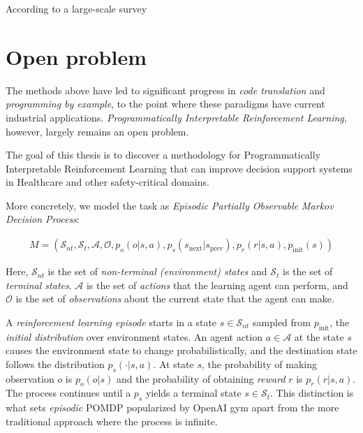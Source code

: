 According to a large-scale survey \cite{liangLargeScaleSurveyUsability2024} 

\newpage
\section{Open problem}

The methods above have led to significant progress in \emph{code translation} and \emph{programming by example}, to the point where these paradigms have current industrial applications.
\emph{Programmatically Interpretable Reinforcement Learning}, however, largely remains an open problem.

\begin{highlight}
The goal of this thesis is to discover a methodology for Programmatically Interpretable Reinforcement Learning that can improve decision support systems in Healthcare and other safety-critical domains.
\end{highlight}


More concretely, we model the task as {\em Episodic Partially Observable Markov Decision Process}:

\begin{multline}
M = (\mathcal{S}_{nt}, \mathcal{S}_t, \mathcal{A}, \mathcal{O}, p_o(o | s, a), p_s(s_\text{next} | s_\text{prev}), p_r(r | s, a), p_\text{init}(s))
\end{multline}

Here, $\mathcal{S}_{nt}$ is the set of {\em non-terminal (environment) states} and $\mathcal{S}_{t}$ is the set of {\em terminal states}. 
$\mathcal{A}$ is the set of {\em actions} that the learning agent can perform, and $\mathcal{O}$ is the set of {\em observations} about the current state that the agent can make. 

A \emph{reinforcement learning episode} starts in a state $s \in \mathcal{S}_{nt}$ sampled from $p_\text{init}$, the {\em initial distribution} over environment states.
An agent action $a \in \mathcal{A}$ at the state $s$ causes the environment state to change probabilistically, and the destination state follows the distribution $p_s(\cdot | s, a)$. 
At state $s$, the probability of making observation $o$ is $p_o(o | s)$ and the probability of obtaining \emph{reward} $r$ is $p_r(r|s,a)$. 
The process continues until a $p_s$ yields a terminal state $s \in \mathcal{S}_t$.
This distinction is what sets \emph{episodic} POMDP popularized by OpenAI gym \cite{openai-gym} apart from the more traditional approach \cite{kramerjdavidrPartiallyObservableMarkov1964, spaanPartiallyObservableMarkov2012} where the process is infinite.

